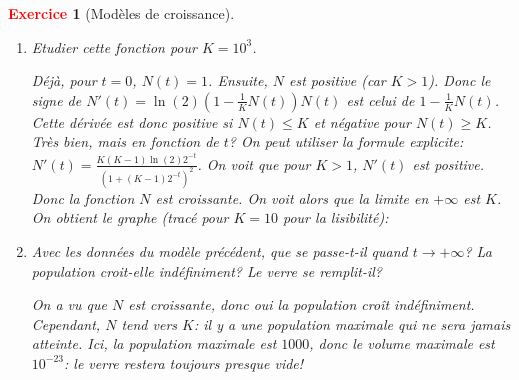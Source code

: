 \documentclass[11pt]{article}
\theoremstyle{mythmstyle}
\newtheorem{exo}{\textcolor{red}{\textbf{Exercice}}}
\begin{document}
\begin{exo}[Modèles de croissance]
\begin{enumerate}
\begin{enumerate}
		
\begin{solution}
		On calcule la dérivée de $N$: $N'(t) = \frac{K(K-1)\ln(2) 2^{-t}}{(1 + (K-1)2^{-t})^2}$.La formule proposée $\ln(2)(1 -\frac 1K N(t)) N(t)$ se calcule:
$$\ln(2)(1 -\frac 1K N(t)) N(t) = \ln(2) \left(\frac{(K-1)2^{-t}}{1+(K-1)2^{-t}}\right)\frac{K}{1+(K-1)2^{-t}.}$$
		On constate que les deux formules sont égales.
\end{solution}

\item Etudier cette fonction pour $K = 10^{3}$.

\begin{solution}

Déjà, pour $t = 0$, $N(t) =1$. Ensuite, $N$ est positive (car $K>1$). Donc le signe de $N'(t) = \ln(2)(1 -\frac 1K N(t)) N(t)$ est celui de $1 -\frac 1K N(t)$. Cette dérivée est donc positive si $N(t)\leq K$ et négative pour $N(t)\geq K$. Très bien, mais en fonction de $t$? On peut utiliser la formule explicite: $N'(t) = \frac{K(K-1)\ln(2) 2^{-t}}{(1 + (K-1)2^{-t})^2}$. On voit que pour $K>1$, $N'(t)$ est positive. Donc la fonction $N$ est croissante. On voit alors que la limite en $+\infty$ est $K$. On obtient le graphe (tracé pour $K=10$ pour la lisibilité):
\begin{center}
\end{center}
\end{solution}

		
\item Avec les données du modèle précédent, que se passe-t-il quand $t\to +\infty$? La population croit-elle indéfiniment? Le verre se remplit-il?

\begin{solution}
On a vu que $N$ est croissante, donc oui la population croît indéfiniment. Cependant, $N$ tend vers $K$: il y a une population maximale qui ne sera jamais atteinte. Ici, la population maximale est $1000$, donc le volume maximale est $10^{-23}$: le verre restera toujours presque vide!
\end{solution}



\end{enumerate}
	

\end{enumerate}
\end{exo}
\end{document}
